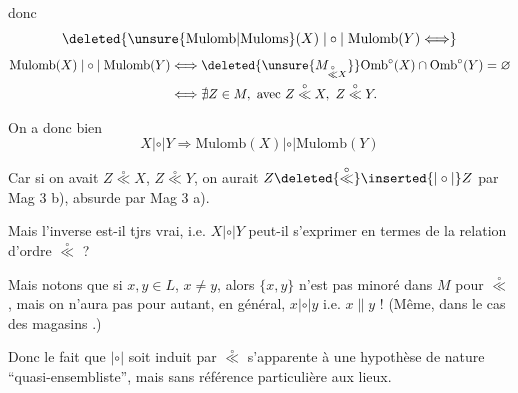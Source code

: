  donc
\[
\deleted{\unsure{\mathrm{Mulomb}|\mathrm{Muloms}}(X)\mathrel{|\circ|}\mathrm{Mulomb}(Y)\Longleftrightarrow}
\]
\[
\begin{aligned}
\mathrm{Mulomb}(X)\mathrel{|\circ|}\mathrm{Mulomb}(Y)&\Longleftrightarrow\deleted{\unsure{M_{\overset{\circ}{\ll}X}}}\mathrm{Omb}^\circ(X)\cap\mathrm{Omb}^\circ(Y)=\varnothing\\
&\Longleftrightarrow\nexists Z\in M,\text{ avec }Z\overset{\circ}{\ll}X,\ Z\overset{\circ}{\ll}Y.
\end{aligned}
\]

On a donc bien
\[
X\mathrel{|\circ|}Y\Longrightarrow\mathrm{Mulomb}(X)\mathrel{|\circ|}\mathrm{Mulomb}(Y)
\]

Car si on avait $Z\overset{\circ}{\ll}X$, $Z\overset{\circ}{\ll}Y$, on aurait $Z\deleted{\overset{\circ}{\ll}}\inserted{\mathrel{|\circ|}}Z$ par Mag 3 b), absurde par Mag 3 a).

Mais l'inverse est-il tjrs vrai, i.e. $X\mathrel{|\circ|}Y$ peut-il s'exprimer en termes de la relation d'ordre $\overset{\circ}{\ll}$ ?

 

Mais notons que si $x,y\in L$, $x\ne y$, alors $\{x,y\}$ n'est pas minoré dans $M$ pour $\overset{\circ}{\ll}$, mais on n'aura pas pour autant, en général, $x\mathrel{|\circ|}y$ i.e. $x\parallel y$ ! (Même, dans le cas des magasins .)

Donc le fait que $\mathrel{|\circ|}$ soit induit par $\overset{\circ}{\ll}$ s'apparente à une hypothèse de nature ``quasi-ensembliste'', mais sans référence particulière aux lieux.
